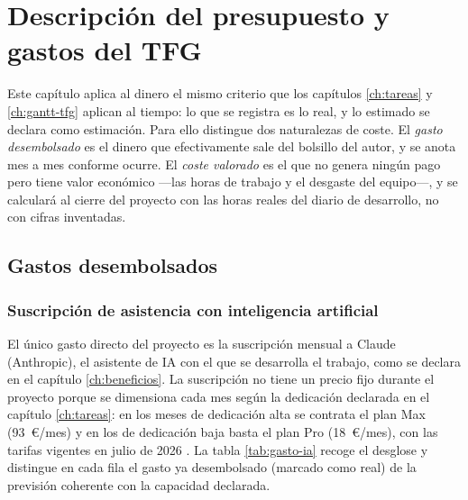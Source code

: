 
\chapter{Descripción del presupuesto y gastos del TFG}
\label{ch:presupuesto}

Este capítulo aplica al dinero el mismo criterio que los capítulos \ref{ch:tareas} y \ref{ch:gantt-tfg} aplican al tiempo: lo que se registra es lo real, y lo estimado se declara como estimación.
Para ello distingue dos naturalezas de coste.
El \emph{gasto desembolsado} es el dinero que efectivamente sale del bolsillo del autor, y se anota mes a mes conforme ocurre.
El \emph{coste valorado} es el que no genera ningún pago pero tiene valor económico —las horas de trabajo y el desgaste del equipo—, y se calculará al cierre del proyecto con las horas reales del diario de desarrollo, no con cifras inventadas.

\section{Gastos desembolsados}
\label{sec:gastos-desembolsados}

\subsection{Suscripción de asistencia con inteligencia artificial}
\label{sec:gasto-ia}

El único gasto directo del proyecto es la suscripción mensual a Claude (Anthropic), el asistente de \ac{IA} con el que se desarrolla el trabajo, como se declara en el capítulo \ref{ch:beneficios}.
La suscripción no tiene un precio fijo durante el proyecto porque se dimensiona cada mes según la dedicación declarada en el capítulo \ref{ch:tareas}: en los meses de dedicación alta se contrata el plan Max (93~€/mes) y en los de dedicación baja basta el plan Pro (18~€/mes), con las tarifas vigentes en julio de 2026 \parencite{anthropic-pricing}.
La tabla \ref{tab:gasto-ia} recoge el desglose y distingue en cada fila el gasto ya desembolsado (marcado como real) de la previsión coherente con la capacidad declarada.


